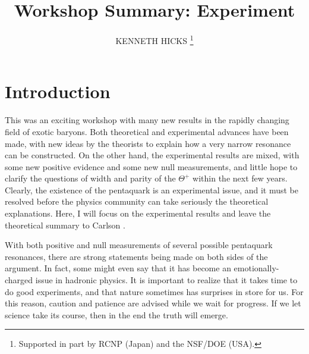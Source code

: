 \documentclass{ws-procs9x6}
\newcommand{\thp}{$\Theta^+$ }
\begin{document}
\title{Workshop Summary: Experiment}

\author{KENNETH HICKS
\footnote{\uppercase{S}upported in part by \uppercase{RCNP} 
(\uppercase{J}apan) and the \uppercase{NSF}/\uppercase{DOE} 
(\uppercase{USA}).}}

\address{Department of Physics and Astonomy \\
Athens, OH 45701, USA \\
E-mail: hicks@ohio.edu}

\maketitle



\section{ Introduction }

This was an exciting workshop with many new results in the 
rapidly changing field of exotic baryons.  Both theoretical 
and experimental advances have been made, with new ideas
by the theorists to explain how a very narrow 
resonance can be constructed.  On the other hand, the 
experimental results are mixed, with some new positive 
evidence and some new null measurements, and little 
hope to clarify the questions of width and parity of the 
\thp within the next few years. Clearly, the existence of 
the pentaquark is an experimental issue, 
and it must be resolved before the physics 
community can take seriously the theoretical explanations. 
Here, I will focus on the experimental results 
and leave the theoretical summary to Carlson \cite{carlson}.

With both positive and null measurements of several 
possible pentaquark resonances, there are strong statements 
being made on both sides of the argument.  In fact, some 
might even say that it has become an emotionally-charged 
issue in hadronic physics.  It is important to realize 
that it takes time to do good experiments, and that nature 
sometimes has surprises in store for us.  For this reason, 
caution and patience are advised while we wait for progress. 
If we let science take its course, then in the end the truth 
will emerge.  
\end{document}
